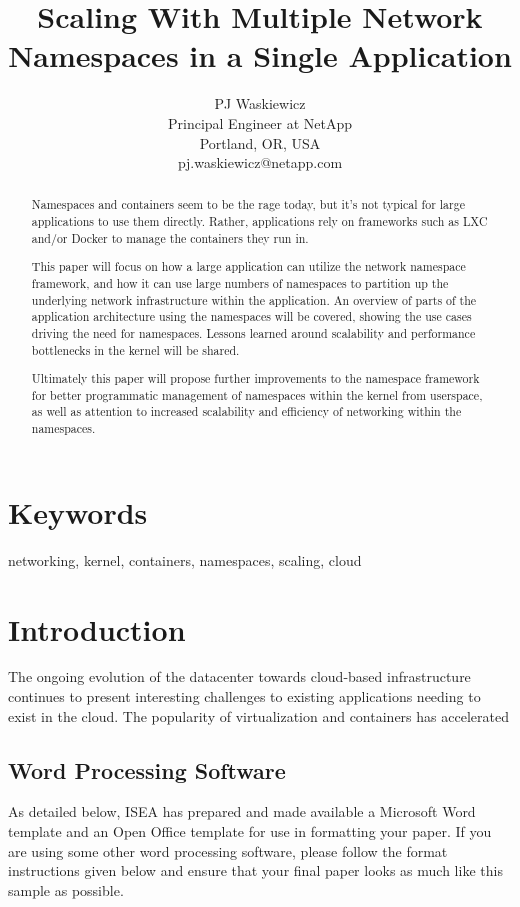 \documentclass[letterpaper]{article}
\title{Scaling With Multiple Network Namespaces in a Single Application}
\author{PJ Waskiewicz\\
Principal Engineer at NetApp\\
Portland, OR, USA\\
pj.waskiewicz@netapp.com\\
\newline
\newline
}
\begin{document}
 
\maketitle
\begin{abstract}
Namespaces and containers seem to be the rage today, but it’s not typical for large applications to use them directly. Rather, applications rely on frameworks such as LXC and/or Docker to manage the containers they run in.

This paper will focus on how a large application can utilize the network namespace framework, and how it can use large numbers of namespaces to partition up the underlying network infrastructure within the application. An overview of parts of the application architecture using the namespaces will be covered, showing the use cases driving the need for namespaces. Lessons learned around scalability and performance bottlenecks in the kernel will be shared.

Ultimately this paper will propose further improvements to the namespace framework for better programmatic management of namespaces within the kernel from userspace, as well as attention to increased scalability and efficiency of networking within the namespaces.
\end{abstract}

\section{Keywords}

networking, kernel, containers, namespaces, scaling, cloud

\section{Introduction}

The ongoing evolution of the datacenter towards cloud-based infrastructure continues to present interesting challenges to existing applications needing to exist in the cloud. The popularity of virtualization and containers has accelerated 

\subsection{Word Processing Software}

As detailed below, ISEA has prepared and made available a Microsoft Word template and an Open Office template for use in formatting your paper. If you are using some other word processing software, please follow the format instructions given below and ensure that your final paper looks as much like this sample as possible.
\end{document}

